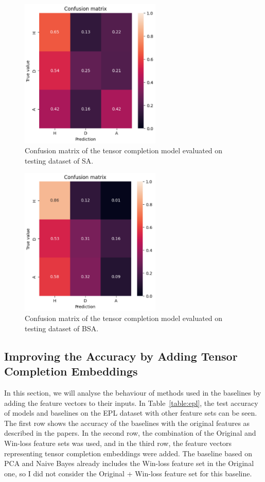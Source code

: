 \documentclass[thesis=M,english]{FITthesis}[2019/12/23]
\begin{document}
\begin{figure}[h]
    \centering
    \includegraphics[width=0.6\textwidth]{figures/cm_sa.png}
    \caption{Confusion matrix of the tensor completion model evaluated on testing dataset of SA.}
    \label{fig:cm_sa}
\end{figure}

\begin{figure}[h]
    \centering
    \includegraphics[width=0.6\textwidth]{figures/cm_bsa.png}
    \caption{Confusion matrix of the tensor completion model evaluated on testing dataset of BSA.}
    \label{fig:cm_bsa}
\end{figure}

\subsection{Improving the Accuracy by Adding Tensor Completion Embeddings}
\label{improving}
In this section, we will analyse the behaviour of methods used in the baselines by adding the feature vectors to their inputs. In Table~\ref{table:epl}, the test accuracy of models and baselines on the EPL dataset with other feature sets can be seen. The first row shows the accuracy of the baselines with the original features as described in the papers. In the second row, the combination of the Original and Win-loss feature sets was used, and in the third row, the feature vectors representing tensor completion embeddings were added. The baseline based on PCA and Naive Bayes already includes the Win-loss feature set in the Original one, so I did not consider the Original + Win-loss feature set for this baseline.
\end{document}
